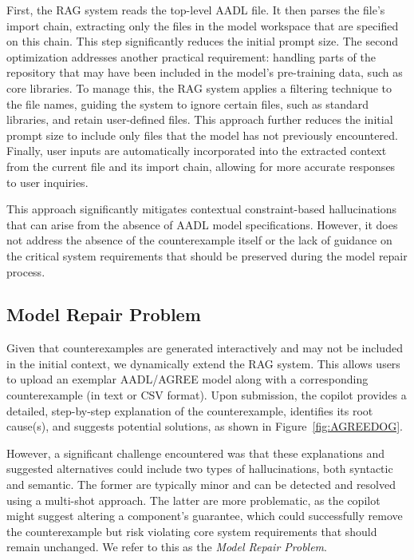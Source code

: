 First, the RAG system reads the top-level AADL file.  It then parses the file's import chain, extracting only the files in the model workspace that are specified on this chain. This step significantly reduces the initial prompt size.%
%
The second optimization addresses another practical requirement: handling parts of the repository that may have been included in the model's pre-training data, such as core libraries. To manage this, the RAG system applies a filtering technique to the file names, guiding the system to ignore certain files, such as standard libraries, and retain user-defined files. This approach further reduces the initial prompt size to include only files that the model has not previously encountered. Finally, user inputs are automatically incorporated into the extracted context from the current file and its import chain, allowing for more accurate responses to user inquiries.

This approach significantly mitigates contextual constraint-based hallucinations that can arise from the absence of AADL model specifications. However, it does not address the absence of the counterexample itself or the lack of guidance on the critical system requirements that should be preserved during the model repair process.
 

\subsection{Model Repair Problem}

Given that counterexamples are generated interactively and may not be included in the initial context, we dynamically extend the RAG system. This allows users to upload an exemplar AADL/AGREE model along with a corresponding counterexample (in text or CSV format). %
Upon submission, the copilot provides a detailed, step-by-step explanation of the counterexample, identifies its root cause(s), and suggests potential solutions, as shown in Figure~\ref{fig:AGREEDOG}. 


However, a significant challenge encountered was that these explanations and suggested alternatives could include two types of hallucinations, both syntactic and semantic. The former are typically minor and can be detected and resolved using a multi-shot approach. The latter are more problematic, as the copilot might suggest altering a component's guarantee, which could successfully remove the counterexample but risk violating core system requirements that should remain unchanged.  We refer to this as the \textit{Model Repair Problem}. 


